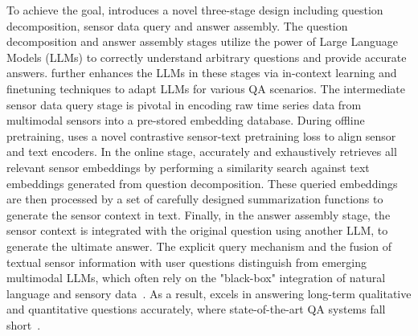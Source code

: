 To achieve the goal, \Method introduces a novel three-stage design including question decomposition, sensor data query and answer assembly.
The question decomposition and answer assembly stages utilize the power of Large Language Models (LLMs) to correctly understand arbitrary questions and provide accurate answers.
\Method further enhances the LLMs in these stages via in-context learning and finetuning techniques to adapt LLMs for various QA scenarios.
The intermediate sensor data query stage is pivotal in encoding raw time series data from multimodal sensors into a pre-stored embedding database. 
During offline pretraining, \Method uses a novel contrastive sensor-text pretraining loss to align sensor and text encoders.
In the online stage, \Method accurately and exhaustively retrieves all relevant sensor embeddings by performing a similarity search against text embeddings generated from question decomposition. These queried embeddings are then processed by a set of carefully designed summarization functions to generate the sensor context in text.
Finally, in the answer assembly stage, the sensor context is integrated with the original question using another LLM, to generate the ultimate answer.
The explicit query mechanism and the fusion of textual sensor information with user questions distinguish \Method from emerging multimodal LLMs, which often rely on the "black-box" integration of natural language and sensory data~\cite{moon-etal-2023-imu2clip,zhang2023llama,liu2024improved,han2024onellm}. 
As a result, \Method excels in answering long-term qualitative and quantitative questions accurately, where state-of-the-art QA systems fall short~\cite{xing2021deepsqa,nie2022ai,chen2024sensor2text,arakawa2024prism,yang2024drhouse}.


